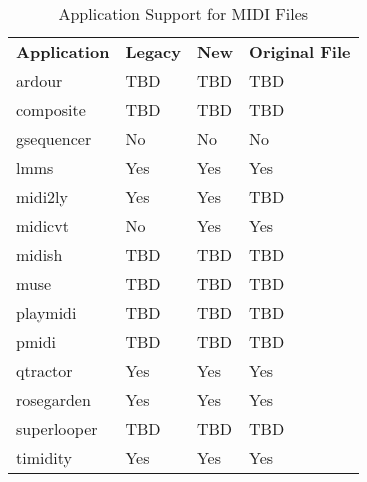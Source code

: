    \begin{table}
      \centering
      \caption{Application Support for MIDI Files}
      \label{table:midi_file_support_table}
      \begin{tabular}{l l l l}
         \textbf{Application}  &
            \textbf{Legacy} &
            \textbf{New} & 
            \textbf{Original File} \\
         ardour       & TBD       & TBD       & TBD \\
         composite    & TBD       & TBD       & TBD \\
         gsequencer   & No        & No        & No \\
         lmms         & Yes       & Yes       & Yes \\
         midi2ly      & Yes       & Yes       & TBD \\
         midicvt      & No        & Yes       & Yes \\
         midish       & TBD       & TBD       & TBD \\
         muse         & TBD       & TBD       & TBD \\
         playmidi     & TBD       & TBD       & TBD \\
         pmidi        & TBD       & TBD       & TBD \\
         qtractor     & Yes       & Yes       & Yes \\
         rosegarden   & Yes       & Yes       & Yes \\
         superlooper  & TBD       & TBD       & TBD \\
         timidity     & Yes       & Yes       & Yes \\
      \end{tabular}
   \end{table}

